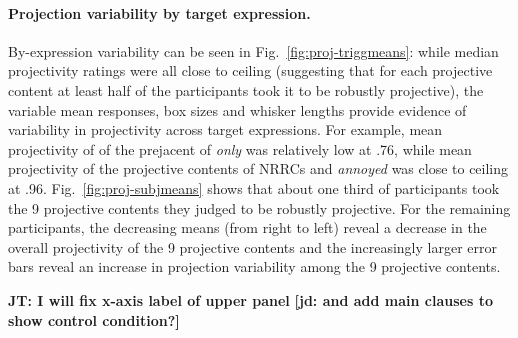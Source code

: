 \documentclass[11pt,fleqn]{article}
\newcommand{\6}{\mbox{$[\hspace*{-.6mm}[$}}
\newcommand{\9}{\mbox{$]\hspace*{-.6mm}]$}}
\newcommand{\figref}[1]{Fig.~\ref{#1}}
\newcommand{\jt}[1]{\textbf{\color{blue}JT: #1}}
\newcommand{\jd}[1]{\textbf{\color{Green}[jd: #1]}}
\begin{document}
\paragraph{Projection variability by target expression.} By-expression variability can be seen in \figref{fig:proj-triggmeans}:  while median projectivity ratings were all close to ceiling (suggesting that for each projective content at least half of the participants took it to be robustly projective), the variable mean responses, box sizes and whisker lengths provide evidence of variability in projectivity across target expressions. For example, mean projectivity of of the prejacent of \emph{only} was relatively low at .76, while mean projectivity of the projective contents of NRRCs and \emph{annoyed} was close to ceiling at .96. \figref{fig:proj-subjmeans} shows that about one third of participants took the 9 projective contents they judged to be robustly projective. For the remaining participants, the decreasing means (from right to left) reveal a decrease in the overall projectivity of the 9 projective contents and the increasingly larger error bars reveal an increase in projection variability among the 9 projective contents. 

\jt{I will fix x-axis label of upper panel} \jd{and add main clauses to show control condition?}
\end{document}
